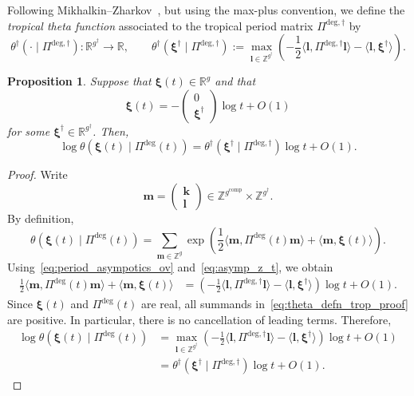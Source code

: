 \documentclass[12pt]{amsart}
\numberwithin{equation}{section}
\newtheorem{proposition}[theorem]{Proposition}
\theoremstyle{definition}
\newcommand{\Z}{\mathbb{Z}}
\newcommand{\R}{\mathbb{R}}
\def\trop{\dagger}
\def\vecptjac{\bm{\xi}}
\def\ptZ{\bm{m}} %
\def\<{\langle}
\def\>{\rangle}
\def\ptCg{\vecptjac}
\begin{document}
Following Mikhalkin--Zharkov~\cite[Section~5.2]{MZ}, but using the
max-plus convention, we define the \emph{tropical theta function}
associated to the tropical period matrix $\Pi^{\mathrm{deg},\trop}$ by
\[
\theta^\trop(\cdot \mid \Pi^{\mathrm{deg},\trop}):\R^{g^\trop}\to\R,\qquad
\theta^\trop
( \ptCg^\trop \mid\Pi^{\mathrm{deg},\trop} )
:=
\max_{\bm{l}\in\Z^{g^\trop}}
\left(
-\frac12
\<\bm{l},\Pi^{\mathrm{deg},\trop}\bm{l}\>
-
\<\bm{l},\ptCg^\trop \>
\right).
\]


\begin{proposition}
\label{lem:theta_tropicalization}
Suppose that $\ptCg(t)\in\R^g$ and that
\begin{equation} \label{eq:asymp_z_t}
\ptCg(t)
=
-
\begin{pmatrix}
0\\
\ptCg^\trop
\end{pmatrix}
\log t
+
O(1)
\end{equation}
for some $\ptCg^\trop\in\R^{g^\trop}$. Then,
\[
\log
\theta
(
\ptCg(t)\mid\Pi^{\mathrm{deg}}(t)
)
=
\theta^\trop
(
\ptCg^\trop\mid\Pi^{\mathrm{deg},\trop}
)
\log t
+
O(1).
\]
\end{proposition}

\begin{proof}
Write
\[
\ptZ
=
\begin{pmatrix}
\bm{k}\\
\bm{l}
\end{pmatrix}
\in
\Z^{g^\mathrm{comp}}\times\Z^{g^\trop}.
\]
By definition,
\begin{equation}\label{eq:theta_defn_trop_proof}
\theta
\left(
\ptCg(t)\mid\Pi^{\mathrm{deg}}(t)
\right)
=
\sum_{\ptZ\in\Z^g}
\exp\left(
\frac12
\<\ptZ,\Pi^{\mathrm{deg}}(t)\ptZ\>
+
\<\ptZ,\ptCg(t)\>
\right).
\end{equation}
Using~\eqref{eq:period_asympotics_ov} and~\eqref{eq:asymp_z_t}, we obtain
\begin{align*}
\frac12
\<\ptZ,\Pi^{\mathrm{deg}}(t)\ptZ\>
+
\<\ptZ,\ptCg(t)\>
&=
\left(
-\frac12
\<\bm{l},
\Pi^{\mathrm{deg},\trop}\bm{l}\>
-
\<\bm{l},\ptCg^\trop\>
\right)
\log t
+
O(1).
\end{align*}
Since $\vecptjac(t)$ and $\Pi^{\mathrm{deg}}(t)$ are real, all summands in~\eqref{eq:theta_defn_trop_proof} are positive.
In particular, there is no cancellation of leading terms. Therefore,
\begin{align*}
\log
\theta
\left(
\ptCg(t)\mid\Pi^{\mathrm{deg}}(t)
\right)
&=
\max_{\bm{l}\in\Z^{g^\trop}}
\left(
-\frac12
\<\bm{l},
\Pi^{\mathrm{deg},\trop}\bm{l}\>
-
\<\bm{l},\ptCg^\trop\>
\right)
\log t
+
O(1)
\\
&=
\theta^\trop
\left(
\ptCg^\trop\mid\Pi^{\mathrm{deg},\trop}
\right)
\log t
+
O(1).
\end{align*}
\end{proof}
\end{document}
